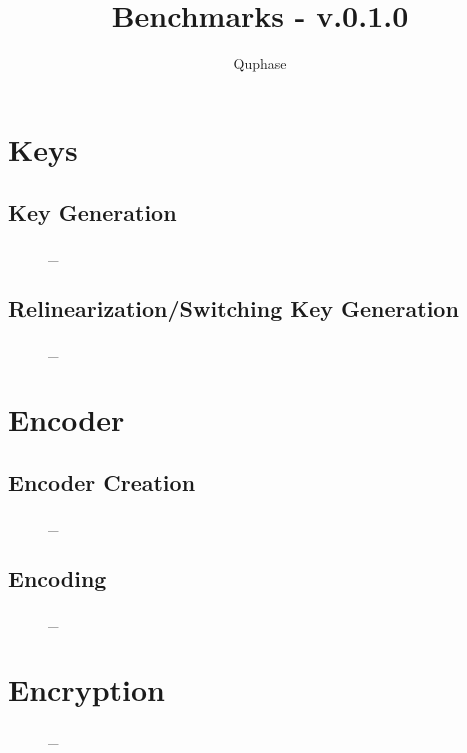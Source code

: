 \documentclass{article}
\title{Benchmarks - v.0.1.0}
\author{Quphase}
\date{}
\makeatletter
\newcommand{\escapeus}{\begingroup\@makeother\_\@escapeus}
\newcommand*{\@escapeus}[1]{#1\endgroup}
\makeatother
\begin{document}
\maketitle
{}
\tableofcontents
\newpage

\section{Keys}
\subsection{Key Generation}
\begin{figure}[H]
    \centering
    \escapeus{}
\end{figure}

\subsection{Relinearization/Switching Key Generation}
\begin{figure}[H]
    \centering
    \escapeus{}
\end{figure}  
\newpage

\section{Encoder}
\subsection{Encoder Creation}
\begin{figure}[H]
    \centering
    \escapeus{}
\end{figure} 

\subsection{Encoding}
\begin{figure}[H]
    \centering
    \escapeus{}
\end{figure}  

\newpage

\section{Encryption}
\begin{figure}[H]
    \centering
    \escapeus{}
\end{figure} 
\end{document}
